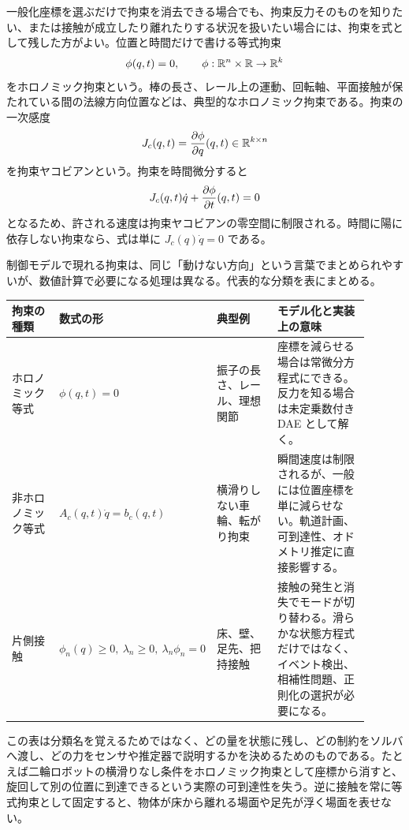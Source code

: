 一般化座標を選ぶだけで拘束を消去できる場合でも、拘束反力そのものを知りたい、または接触が成立したり離れたりする状況を扱いたい場合には、拘束を式として残した方がよい。位置と時間だけで書ける等式拘束
\begin{equation}
  \phi(q,t)=0,\qquad
  \phi:\mathbb{R}^n\times\mathbb{R}\to\mathbb{R}^k
\end{equation}
をホロノミック拘束という。棒の長さ、レール上の運動、回転軸、平面接触が保たれている間の法線方向位置などは、典型的なホロノミック拘束である。拘束の一次感度
\begin{equation}
  J_c(q,t)=\frac{\partial \phi}{\partial q}(q,t)\in\mathbb{R}^{k\times n}
\end{equation}
を拘束ヤコビアンという。拘束を時間微分すると
\begin{equation}
  J_c(q,t)\dot{q}+\frac{\partial \phi}{\partial t}(q,t)=0
\end{equation}
となるため、許される速度は拘束ヤコビアンの零空間に制限される。時間に陽に依存しない拘束なら、式は単に $J_c(q)\dot{q}=0$ である。

制御モデルで現れる拘束は、同じ「動けない方向」という言葉でまとめられやすいが、数値計算で必要になる処理は異なる。代表的な分類を表にまとめる。

\begin{center}
\scriptsize
\setlength{\tabcolsep}{3pt}
\renewcommand{\arraystretch}{1.25}
\begin{tabular}{|>{\raggedright\arraybackslash}p{0.16\linewidth}|>{\raggedright\arraybackslash}p{0.22\linewidth}|>{\raggedright\arraybackslash}p{0.20\linewidth}|>{\raggedright\arraybackslash}p{0.32\linewidth}|}
\hline
拘束の種類 & 数式の形 & 典型例 & モデル化と実装上の意味\\
\hline
ホロノミック等式 & $\phi(q,t)=0$ & 振子の長さ、レール、理想関節 & 座標を減らせる場合は常微分方程式にできる。反力を知る場合は未定乗数付き DAE として解く。\\
\hline
非ホロノミック等式 & $A_c(q,t)\dot{q}=b_c(q,t)$ & 横滑りしない車輪、転がり拘束 & 瞬間速度は制限されるが、一般には位置座標を単に減らせない。軌道計画、可到達性、オドメトリ推定に直接影響する。\\
\hline
片側接触 & $\phi_n(q)\ge0,\ \lambda_n\ge0,\ \lambda_n\phi_n=0$ & 床、壁、足先、把持接触 & 接触の発生と消失でモードが切り替わる。滑らかな状態方程式だけではなく、イベント検出、相補性問題、正則化の選択が必要になる。\\
\hline
\end{tabular}
\end{center}

この表は分類名を覚えるためではなく、どの量を状態に残し、どの制約をソルバへ渡し、どの力をセンサや推定器で説明するかを決めるためのものである。たとえば二輪ロボットの横滑りなし条件をホロノミック拘束として座標から消すと、旋回して別の位置に到達できるという実際の可到達性を失う。逆に接触を常に等式拘束として固定すると、物体が床から離れる場面や足先が浮く場面を表せない。

